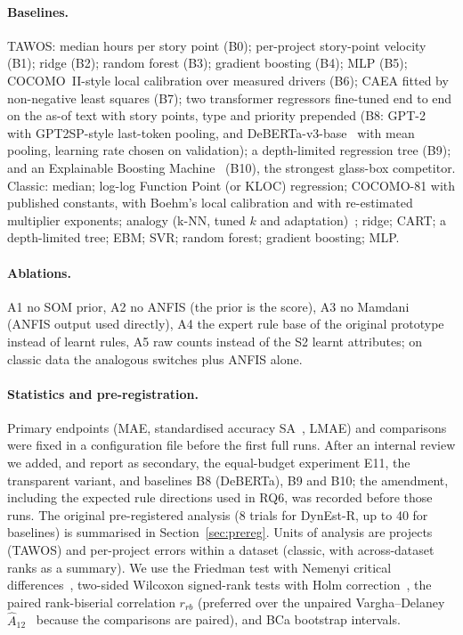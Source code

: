 \documentclass[preprint,12pt,authoryear]{elsarticle}
\newcommand{\dynest}{DynEst-R\xspace}
\begin{document}
\paragraph{Baselines.}  TAWOS: median hours per story point (B0); per-project story-point velocity (B1); ridge (B2);
random forest (B3); gradient boosting (B4); MLP (B5); COCOMO~II-style local calibration over measured drivers (B6);
CAEA fitted by non-negative least squares (B7); two transformer regressors fine-tuned end to end on the as-of text
with story points, type and priority prepended (B8: GPT-2~\citep{radford2019gpt2} with GPT2SP-style last-token pooling,
and DeBERTa-v3-base~\citep{he2023debertav3} with mean pooling, learning rate chosen on validation); a depth-limited
regression tree (B9); and an Explainable Boosting Machine~\citep{lou2013ga2m,nori2019interpretml} (B10), the
strongest glass-box competitor.
Classic: median; log-log Function Point (or KLOC) regression; COCOMO-81 with published constants, with Boehm's local
calibration and with re-estimated multiplier exponents; analogy (k-NN, tuned $k$ and
adaptation)~\citep{shepperd1997analogy}; ridge; CART; a depth-limited tree; EBM; SVR; random forest; gradient
boosting; MLP.

\paragraph{Ablations.}  A1 no SOM prior, A2 no ANFIS (the prior is the score), A3 no Mamdani (ANFIS output used
directly), A4 the expert rule base of the original prototype instead of learnt rules, A5 raw counts instead of the S2
learnt attributes; on classic data the analogous switches plus ANFIS alone.

\paragraph{Statistics and pre-registration.}  Primary endpoints (MAE, standardised accuracy
SA~\citep{shepperd2012sa}, LMAE) and comparisons were fixed in a configuration file before the first full runs.  After
an internal review we added, and report as secondary, the equal-budget experiment E11, the transparent variant, and
baselines B8 (DeBERTa), B9 and B10; the amendment, including the expected rule directions used in RQ6, was recorded
before those runs.  The original pre-registered analysis (8 trials for \dynest, up to 40 for baselines) is summarised
in Section~\ref{sec:prereg}.  Units of analysis are projects (TAWOS) and per-project errors within a dataset (classic,
with across-dataset ranks as a summary).  We use the Friedman test with Nemenyi critical differences~\citep{demsar2006},
two-sided Wilcoxon signed-rank tests with Holm correction~\citep{holm1979}, the paired rank-biserial correlation
$r_{rb}$ (preferred over the unpaired Vargha--Delaney $\hat{A}_{12}$~\citep{vargha2000} because the comparisons are
paired), and BCa bootstrap intervals.
\end{document}
